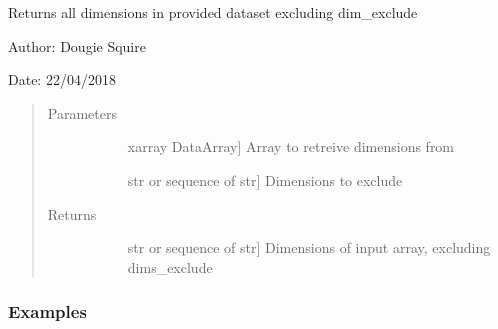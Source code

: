 \documentclass[letterpaper,10pt,english]{sphinxmanual}
\begin{document}
\begin{fulllineitems}
\label{\detokenize{utils_doc:utils.get_other_dims}}
Returns all dimensions in provided dataset excluding dim\_exclude

\begin{DUlineblock}{0em}
\item[] Author: Dougie Squire
\item[] Date: 22/04/2018
\end{DUlineblock}
\begin{quote}\begin{description}
\item[{Parameters}] \leavevmode\begin{description}
\item[{}] \leavevmode{[}xarray DataArray{]}
Array to retreive dimensions from

\item[{}] \leavevmode{[}str or sequence of str{]}
Dimensions to exclude

\end{description}

\item[{Returns}] \leavevmode\begin{description}
\item[{}] \leavevmode{[}str or sequence of str{]}
Dimensions of input array, excluding dims\_exclude

\end{description}

\end{description}\end{quote}
\subsubsection*{Examples}

\begin{sphinxVerbatim}[commandchars=\\\{\}]
   \PYG{p}{[}  
                                                        \PYG{p}{]}
 
\end{sphinxVerbatim}


\end{fulllineitems}
\end{document}
